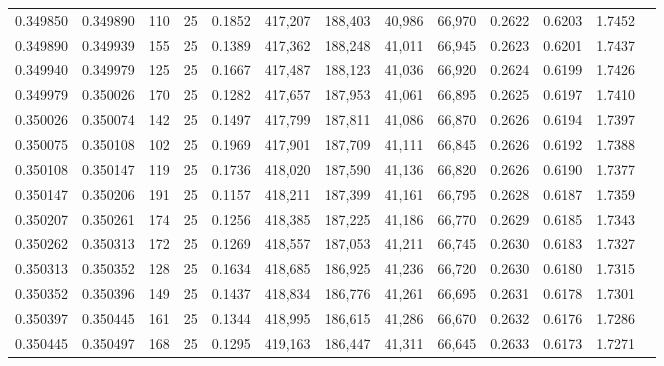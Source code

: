 \begin{tabular}{rrrrrrrrrrrrr}
0.349850 & 0.349890 &   110 &  25 &                                     0.1852 & 417,207 & 188,403 &  40,986 &  66,970 & 0.2622 & 0.6203 & 1.7452 \\
0.349890 & 0.349939 &   155 &  25 &                                     0.1389 & 417,362 & 188,248 &  41,011 &  66,945 & 0.2623 & 0.6201 & 1.7437 \\
0.349940 & 0.349979 &   125 &  25 &                                     0.1667 & 417,487 & 188,123 &  41,036 &  66,920 & 0.2624 & 0.6199 & 1.7426 \\
0.349979 & 0.350026 &   170 &  25 &                                     0.1282 & 417,657 & 187,953 &  41,061 &  66,895 & 0.2625 & 0.6197 & 1.7410 \\
0.350026 & 0.350074 &   142 &  25 &                                     0.1497 & 417,799 & 187,811 &  41,086 &  66,870 & 0.2626 & 0.6194 & 1.7397 \\
0.350075 & 0.350108 &   102 &  25 &                                     0.1969 & 417,901 & 187,709 &  41,111 &  66,845 & 0.2626 & 0.6192 & 1.7388 \\
0.350108 & 0.350147 &   119 &  25 &                                     0.1736 & 418,020 & 187,590 &  41,136 &  66,820 & 0.2626 & 0.6190 & 1.7377 \\
0.350147 & 0.350206 &   191 &  25 &                                     0.1157 & 418,211 & 187,399 &  41,161 &  66,795 & 0.2628 & 0.6187 & 1.7359 \\
0.350207 & 0.350261 &   174 &  25 &                                     0.1256 & 418,385 & 187,225 &  41,186 &  66,770 & 0.2629 & 0.6185 & 1.7343 \\
0.350262 & 0.350313 &   172 &  25 &                                     0.1269 & 418,557 & 187,053 &  41,211 &  66,745 & 0.2630 & 0.6183 & 1.7327 \\
0.350313 & 0.350352 &   128 &  25 &                                     0.1634 & 418,685 & 186,925 &  41,236 &  66,720 & 0.2630 & 0.6180 & 1.7315 \\
0.350352 & 0.350396 &   149 &  25 &                                     0.1437 & 418,834 & 186,776 &  41,261 &  66,695 & 0.2631 & 0.6178 & 1.7301 \\
0.350397 & 0.350445 &   161 &  25 &                                     0.1344 & 418,995 & 186,615 &  41,286 &  66,670 & 0.2632 & 0.6176 & 1.7286 \\
0.350445 & 0.350497 &   168 &  25 &                                     0.1295 & 419,163 & 186,447 &  41,311 &  66,645 & 0.2633 & 0.6173 & 1.7271 \\

\end{tabular}
